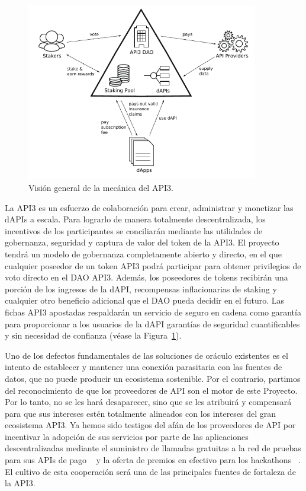 \documentclass[11pt]{article}
\begin{document}
\begin{figure}[!t]
    \centering
    \includegraphics[width=0.9\textwidth]{fig/teaser.pdf}
	\caption{Visión general de la mecánica del API3.}
	\label{fig:teaser}
\end{figure}

La API3 es un esfuerzo de colaboración para crear, administrar y monetizar las dAPIs a escala. Para lograrlo de manera totalmente descentralizada, los incentivos de los participantes se conciliarán mediante las utilidades de gobernanza, seguridad y captura de valor del token de la API3. El proyecto tendrá un modelo de gobernanza completamente abierto y directo, en el que cualquier poseedor de un token API3 podrá participar para obtener privilegios de voto directo en el DAO API3. Además, los poseedores de tokens recibirán una porción de los ingresos de la dAPI, recompensas inflacionarias de staking y cualquier otro beneficio adicional que el DAO pueda decidir en el futuro. Las fichas API3 apostadas respaldarán un servicio de seguro en cadena como garantía para proporcionar a los usuarios de la dAPI garantías de seguridad cuantificables y sin necesidad de  confianza  (véase la Figura~\ref{fig:teaser}).

Uno de los defectos fundamentales de las soluciones de oráculo existentes es el intento de establecer y mantener una conexión parasitaria con las fuentes de datos, que no puede producir un ecosistema sostenible. Por el contrario, partimos del reconocimiento de que los proveedores de API son el motor de este Proyecto. Por lo tanto, no se les hará desaparecer, sino que se les atribuirá y compensará para que sus intereses estén totalmente alineados con los intereses del gran ecosistema API3. Ya hemos sido testigos del afán de los proveedores de API por incentivar la adopción de sus servicios por parte de las aplicaciones descentralizadas mediante el suministro de llamadas gratuitas a la red de pruebas para sus APIs de pago ~\cite{honeycomb.market}
y la oferta de premios en efectivo para los hackathons ~\cite{honeycomb-hackathon}.
El cultivo de esta cooperación será una de las principales fuentes de fortaleza de la API3.
\end{document}
